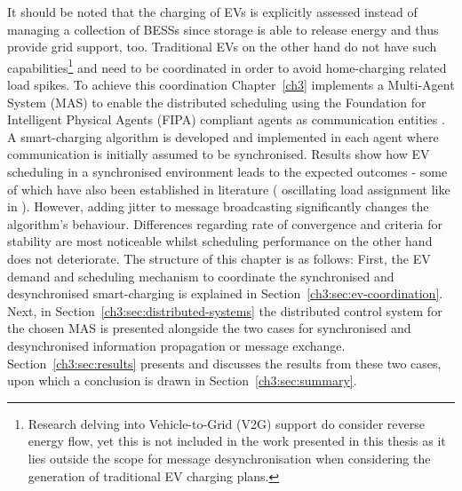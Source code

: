 It should be noted that the charging of EVs is explicitly assessed instead of managing a collection of BESSs since storage is able to release energy and thus provide grid support, too.
Traditional EVs on the other hand do not have such capabilities\footnote{Research delving into Vehicle-to-Grid (V2G) support do consider reverse energy flow, yet this is not included in the work presented in this thesis as it lies outside the scope for message desynchronisation when considering the generation of traditional EV charging plans.} and need to be coordinated in order to avoid home-charging related load spikes.
To achieve this coordination Chapter~\ref{ch3} implements a Multi-Agent System (MAS) to enable the distributed scheduling using the Foundation for Intelligent Physical Agents (FIPA) compliant agents as communication entities \cite{FIPA-website}.
A smart-charging algorithm is developed and implemented in each agent where communication is initially assumed to be synchronised.
Results show how EV scheduling in a synchronised environment leads to the expected outcomes - some of which have also been established in literature ( oscillating load assignment like in \cite{Karfopoulos2013}).
However, adding jitter to message broadcasting significantly changes the algorithm's behaviour.
Differences regarding rate of convergence and criteria for stability are most noticeable whilst scheduling performance on the other hand does not deteriorate.
The structure of this chapter is as follows:
First, the EV demand and scheduling mechanism to coordinate the synchronised and desynchronised smart-charging is explained in Section~\ref{ch3:sec:ev-coordination}.
Next, in Section~\ref{ch3:sec:distributed-systems} the distributed control system for the chosen MAS is presented alongside the two cases for synchronised and desynchronised information propagation or message exchange.
Section~\ref{ch3:sec:results} presents and discusses the results from these two cases, upon which a conclusion is drawn in Section~\ref{ch3:sec:summary}.

